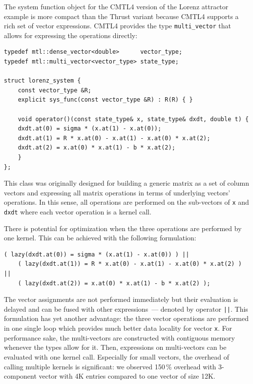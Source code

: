 \documentclass[final]{siamltex}
\newcommand{\code}[1]{\lstinline$#1$}
\begin{document}
The system function object for the CMTL4 version of the Lorenz attractor example is
more compact than the Thrust variant because CMTL4 supports a rich set of vector
expressions.  CMTL4 provides the type \code{multi_vector} that allows for
expressing the operations directly:
\begin{lstlisting}
typedef mtl::dense_vector<double>      vector_type;
typedef mtl::multi_vector<vector_type> state_type;

struct lorenz_system {
    const vector_type &R;
    explicit sys_func(const vector_type &R) : R(R) { }

    void operator()(const state_type& x, state_type& dxdt, double t) {
	dxdt.at(0) = sigma * (x.at(1) - x.at(0));
	dxdt.at(1) = R * x.at(0) - x.at(1) - x.at(0) * x.at(2);
	dxdt.at(2) = x.at(0) * x.at(1) - b * x.at(2);
    }
};
\end{lstlisting}
This class was originally designed for building a generic matrix as a set of
column vectors and expressing all matrix operations in terms of underlying
vectors' operations.
In this sense, all operations are performed on the sub-vectors of \code{x} and
\code{dxdt} where each vector operation is a kernel call.

There is potential for optimization when the three operations are performed by one
kernel.
This can be achieved with the following formulation:
\begin{lstlisting}[firstnumber=9]
    ( lazy(dxdt.at(0)) = sigma * (x.at(1) - x.at(0)) ) ||
    ( lazy(dxdt.at(1)) = R * x.at(0) - x.at(1) - x.at(0) * x.at(2) ) ||
    ( lazy(dxdt.at(2)) = x.at(0) * x.at(1) - b * x.at(2) );
\end{lstlisting}
The vector assignments are not performed immediately but their evaluation is delayed
and can be fused with other expressions~--- denoted by operator \code{||}. 
This formulation has yet another advantage: the three vector operations
are performed in one single loop which provides much better data locality
for vector \code{x}.
For performance sake, the multi-vectors are constructed with contiguous memory
whenever the types allow for it.
Then, expressions on multi-vectors can be evaluated with one kernel call.
Especially for small vectors, the overhead of calling multiple kernels
is significant: we observed 150\,\% overhead with 3-component vector with 4K
entries compared to one vector of size 12K.
\end{document}
